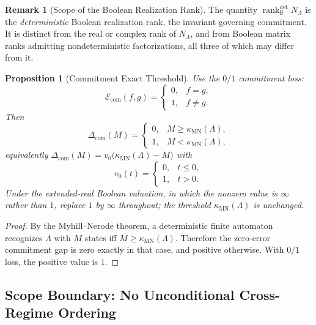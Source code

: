 \documentclass[12pt]{article}
\newtheorem{proposition}[theorem]{Proposition}
\theoremstyle{definition}
\newtheorem{remark}[theorem]{Remark}
\newcommand{\Com}{\Delta_{\mathrm{com}}}
\newcommand{\rankBdet}{\operatorname{rank}_{\mathbb B}^{\mathrm{det}}}
\newcommand{\kappaMN}{\kappa_{\mathrm{MN}}}
\begin{document}
\begin{remark}[Scope of the Boolean Realization Rank]
\label{rem:boolean-rank-not-ordinary}
The quantity $\rankBdet N_\Lambda$ is the \emph{deterministic} Boolean
realization rank, the invariant governing commitment.  It is distinct from the
real or complex rank of $N_\Lambda$, and from Boolean matrix ranks admitting
nondeterministic factorizations, all three of which may differ from it.
\end{remark}

\begin{proposition}[Commitment Exact Threshold]
\label{prop:com-threshold}
Use the $0/1$ commitment loss:
\[
\mathcal E_{\mathrm{com}}(f,g)
=
\begin{cases}
0,& f=g,\\
1,& f\neq g.
\end{cases}
\]
Then
\[
\Com(M)
=
\begin{cases}
0,& M\ge \kappaMN(\Lambda),\\
1,& M<\kappaMN(\Lambda),
\end{cases}
\]
equivalently $\Com(M)=v_0\bigl(\kappaMN(\Lambda)-M\bigr)$ with
\[
v_0(t)=
\begin{cases}
0,& t\le0,\\
1,& t>0.
\end{cases}
\]
Under the extended-real Boolean valuation, in which the nonzero value is
$\infty$ rather than $1$, replace $1$ by $\infty$ throughout; the threshold
$\kappaMN(\Lambda)$ is unchanged.
\end{proposition}

\begin{proof}
By the Myhill--Nerode theorem, a deterministic finite automaton recognizes
$\Lambda$ with $M$ states iff $M\ge\kappaMN(\Lambda)$.  Therefore the
zero-error commitment gap is zero exactly in that case, and positive otherwise.
With $0/1$ loss, the positive value is $1$.
\end{proof}

\subsection{Scope Boundary: No Unconditional Cross-Regime Ordering}
\label{subsec:schatten-nogo}
\end{document}
